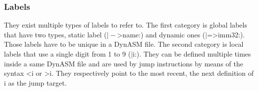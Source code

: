 \subsubsection{Labels}
They exist multiple types of labels to refer to. The first category is global
labels that have two types, static label ($\vert-$\textgreater name:) and dynamic ones ($\vert$=\textgreater imm32:).
Those labels have to be unique in a DynASM file. The second category is local
labels that use a single digit from 1 to 9 ($\vert$i:). They can be defined
multiple times inside a same DynASM file and are used by jump instructions by
means of the syntax \textless i or \textgreater i. They respectively point to
the most recent, the next definition of i as the jump target.